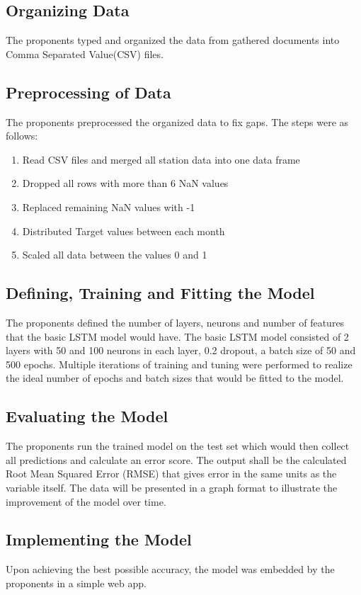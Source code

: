 \documentclass[10pt,11pt,12pt,oneside]{book}
\begin{document}
    \subsection{Organizing Data}
    The proponents typed and organized the data from gathered documents into Comma Separated Value(CSV) files.
    \subsection{Preprocessing of Data}
    The proponents preprocessed the organized data to fix gaps. The steps were as follows:
    \begin{enumerate}
        \item Read CSV files and merged all station data into one data frame
        \item Dropped all rows with more than 6 NaN values
        \item Replaced remaining NaN values with -1
        \item Distributed Target values between each month
        \item Scaled all data between the values 0 and 1
    \end{enumerate}
    \subsection{Defining, Training and Fitting the Model}
    The proponents defined the number of layers, neurons and number of features that the basic LSTM model would have. The basic LSTM model consisted of 2 layers with 50 and 100 neurons in each layer, 0.2 dropout, a batch size of 50 and 500 epochs. Multiple iterations of training and tuning were performed to realize the ideal number of epochs and batch sizes that would be fitted to the model.
    \subsection{Evaluating the Model}
    The proponents run the trained model on the test set which would then collect all predictions and calculate an error score. The output shall be the calculated Root Mean Squared Error (RMSE) that gives error in the same units as the variable itself. The data will be presented in a graph format to illustrate the improvement of the model over time.
    \subsection{Implementing the Model}
    Upon achieving the best possible accuracy, the model was embedded by the proponents in a simple web app.
\end{document}
